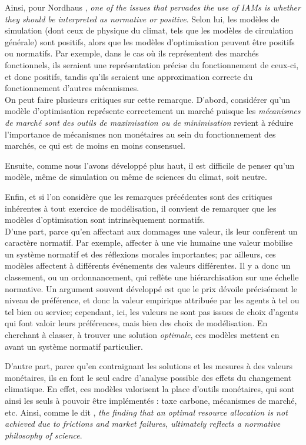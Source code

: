 Ainsi, pour Nordhaus \cite{nordhaus_dice_2013}, \emph{one of the issues that pervades the use of IAMs is whether they should be interpreted as normative or positive}. Selon lui, les modèles de simulation (dont ceux de physique du climat, tels que les modèles de circulation générale) sont positifs, alors que les modèles d'optimisation peuvent être positifs ou normatifs. Par exemple, dans le cas où ils représentent des marchés fonctionnels, ils seraient une représentation précise du fonctionnement de ceux-ci, et donc positifs, tandis qu'ils seraient une approximation correcte du fonctionnement d'autres mécanismes. \\

On peut faire plusieurs critiques sur cette remarque. D'abord, considérer qu'un modèle d'optimisation représente correctement un marché puisque les \emph{mécanismes de marché sont des outils de maximisation ou de minimisation} revient à réduire l'importance de mécanismes non monétaires au sein du fonctionnement des marchés, ce qui est de moins en moins consensuel. 

Ensuite, comme nous l'avons développé plus haut, il est difficile de penser qu'un modèle, même de simulation ou même de sciences du climat, soit neutre. 

Enfin, et si l'on considère que les remarques précédentes sont des critiques inhérentes à tout exercice de modélisation, il convient de remarquer que les modèles d'optimisation sont intrinsèquement normatifs. \\

D'une part, parce qu'en affectant aux dommages une valeur, ils leur confèrent un caractère normatif. Par exemple, affecter à une vie humaine une valeur mobilise un système normatif et des réflexions morales importantes; par ailleurs, ces modèles affectent à différents événements des valeurs différentes. Il y a donc un classement, ou un ordonnancement, qui reflète une hiérarchisation sur une échelle normative. Un argument souvent développé est que le prix dévoile précisément le niveau de préférence, et donc la valeur empirique attribuée par les agents à tel ou tel bien ou service; cependant, ici, les valeurs ne sont pas issues de choix d'agents qui font valoir leurs préférences, mais bien des choix de modélisation. En cherchant à classer, à trouver une solution \emph{optimale}, ces modèles mettent en avant un système normatif particulier. 

D'autre part, parce qu'en contraignant les solutions et les mesures à des valeurs monétaires, ils en font le seul cadre d'analyse possible des effets du changement climatique. En effet, ces modèles valorisent la place d'outils monétaires, qui sont ainsi les seuls à pouvoir être implémentés : taxe carbone, mécanismes de marché, etc. Ainsi, comme le dit \cite{mercure_modelling_2019}, \emph{the finding that an optimal resource allocation is not achieved due to frictions and market failures, ultimately reflects a normative philosophy of science}. 

